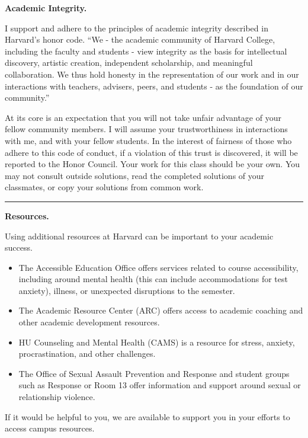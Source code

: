 \documentclass[12pt,letterpaper]{exam}
\begin{document}
\noindent\textbf{Academic Integrity.}

I support and adhere to the principles of academic integrity described in Harvard’s honor code.  “We - the academic community of Harvard College, including the faculty and students - view integrity as the basis for intellectual discovery, artistic creation, independent scholarship, and meaningful collaboration. We thus hold honesty in the representation of our work and in our interactions with teachers, advisers, peers, and students - as the foundation of our community.”  

At its core is an expectation that you will not take unfair advantage of your fellow community members. 
I will assume your trustworthiness in interactions with me, and with your fellow students.  In the interest of fairness of those who adhere to this code of conduct, if a violation of this trust is discovered, it will be reported to the Honor Council.
Your work for this class should be your own.  You may not consult outside solutions, read the completed solutions of your classmates, or copy your solutions from common work.


\vspace{0.5cm}
\hrule
\vspace{0.5cm}

\noindent\textbf{Resources.}

Using additional resources at Harvard can be important to your academic success. 
\begin{itemize}
    \item The Accessible Education Office offers services related to course accessibility, including around mental health (this can include accommodations for test anxiety), illness, or unexpected disruptions to the semester.
    \item The Academic Resource Center (ARC) offers access to academic coaching and other academic development resources.
    \item HU Counseling and Mental Health (CAMS) is a resource for stress, anxiety, procrastination, and other challenges.  
    \item The Office of Sexual Assault Prevention and Response and student groups such as Response or Room 13 offer information and support around sexual or relationship violence.  
\end{itemize}  
If it would be helpful to you, we are available to support you in your efforts to access campus resources.  

\printbibliography[title={Course References}]
\eject
\end{document}
